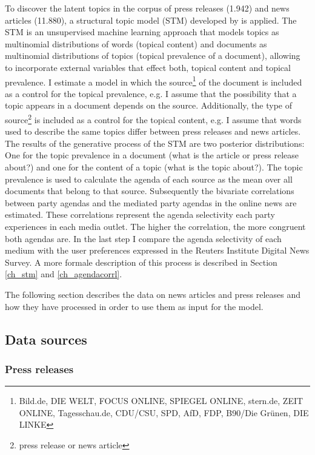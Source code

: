\documentclass[12pt,a4paper,notitlepage]{article}
\begin{document}
To discover the latent topics in the corpus of press releases (1.942) and news articles (11.880), a structural topic model (STM) developed by \citet{roberts_model_2016} is applied. The STM is an unsupervised machine learning approach that models topics as multinomial distributions of words (topical content) and documents as multinomial distributions of topics (topical prevalence of a document), allowing to incorporate external variables that effect both, topical content and topical prevalence. I estimate a model in which the source\footnote{Bild.de, DIE WELT, FOCUS ONLINE, SPIEGEL ONLINE, stern.de, ZEIT ONLINE, Tagesschau.de, CDU/CSU, SPD, AfD, FDP, B90/Die Grünen, DIE LINKE} of the document is included as a control for the topical prevalence, e.g. I assume that the possibility that a topic appears in a document depends on the source. Additionally, the type of source\footnote{press release or news article} is included as a control for the topical content, e.g. I assume that words used to describe the same topics differ between press releases and news articles. The results of the generative process of the STM are two posterior distributions: One for the topic prevalence in a document (what is the article or press release about?) and one for the content of a topic (what is the topic about?). The topic prevalence is used to calculate the agenda of each source as the mean over all documents that belong to that source. Subsequently the bivariate correlations between party agendas and the mediated party agendas in the online news are estimated. These correlations represent the agenda selectivity each party experiences in each media outlet. The higher the correlation, the more congruent both agendas are. In the last step I compare the agenda selectivity of each medium with the user preferences expressed in the Reuters Institute Digital News Survey. A more formale description of this process is described in Section \ref{ch_stm} and \ref{ch_agendacorrl}.

The following section describes the data on news articles and press releases and how they have processed in order to use them as input for the model. 

\subsection{Data sources}\label{ch_data}

\subsubsection{Press releases}
\end{document}
